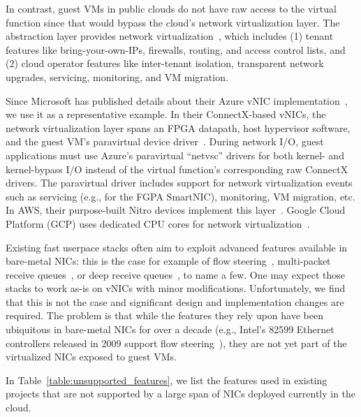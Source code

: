 In contrast, guest VMs in public clouds do not have raw access to the virtual function since that would bypass the cloud's network virtualization layer.
The abstraction layer provides network virtualization~\cite{Koponen:nsdi14,azure_smartnic,andromeda}, which includes (1) tenant features like bring-your-own-IPs, firewalls, routing, and access control lists, and (2) cloud operator features like inter-tenant isolation, transparent network upgrades, servicing, monitoring, and VM migration.

Since Microsoft has published details about their Azure vNIC implementation~\cite{vfp, azure_smartnic}, we use it as a representative example.
In their ConnectX-based vNICs, the network virtualization layer spans an FPGA datapath, host hypervisor software, and the guest VM's paravirtual device driver~\cite{azure_smartnic}.
During network I/O, guest applications must use Azure's paravirtual ``netvsc'' drivers for both kernel- and kernel-bypass I/O instead of the virtual function's corresponding raw ConnectX drivers.
The paravirtual driver includes support for network virtualization events such as servicing (e.g., for the FGPA SmartNIC), monitoring, VM migration, etc.
In AWS, their purpose-built Nitro devices implement this layer~\cite{nitro}.
Google Cloud Platform (GCP) uses dedicated CPU cores for network virtualization~\cite{snap}.

Existing fast userpace stacks often aim to exploit advanced features available in bare-metal NICs: this is the case for example of flow steering~\cite{mtcp, erpc,demi-kernel}, multi-packet receive queues~\cite{erpc,virtuoso}, or deep receive queues~\cite{erpc}, to name a few.
One may expect those stacks to work as-is on vNICs with minor modifications. Unfortunately, we find that this is not the case and significant design and implementation changes are required.
The problem is that while the features they rely upon have been ubiquitous in bare-metal NICs for over a decade (e.g., Intel's 82599 Ethernet controllers released in 2009 support flow steering~\cite{intel-82599}), they are not yet part of the virtualized NICs exposed to guest VMs.

In Table~\ref{table:unsupported_features}, we list the features used in existing projects that are not supported by a large span of NICs deployed currently in the cloud.

\vspace{0.1in}
\noindent{}

